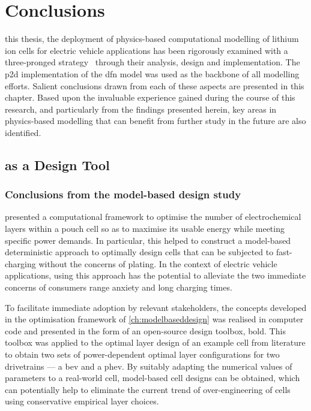 
\clearpage
\chapter{Conclusions}\label{ch:conclusions}
\startcontents[chapters]

\bigskip

 this  thesis, the  deployment of  physics-based computational
modelling  of lithium  ion  cells  for electric  vehicle  applications has  been
rigorously examined  with a three-pronged strategy  \viz~through their analysis,
design and implementation.  The \gls{p2d} implementation of  the \gls{dfn} model
was  used  as  the  backbone  of  all  modelling  efforts.  Salient  conclusions
drawn  from each  of these  aspects are  presented in  this chapter.  Based upon
the  invaluable  experience gained  during  the  course  of this  research,  and
particularly  from the  findings presented  herein, key  areas in  physics-based
modelling that can benefit from further study in the future are also identified.


\section{ as a Design Tool}

\subsection{Conclusions from the model-based design study}\label{sec:modelbasedconclusion}

 presented  a computational framework to  optimise the
number  of electrochemical  layers within  a pouch  cell so  as to  maximise its
usable energy while  meeting specific power demands. In  particular, this helped
to construct a model-based deterministic approach to optimally design cells that
can  be subjected  to  fast-charging without  the concerns  of  plating. In  the
context of electric vehicle applications,  using this approach has the potential
to alleviate  the two immediate concerns  of consumers \viz{} range  anxiety and
long charging times.

To  facilitate  immediate  adoption   by  relevant  stakeholders,  the  concepts
developed  in  the  optimisation  framework  of  \cref{ch:modelbaseddesign}  was
realised in  computer code and  presented in the  form of an  open-source design
toolbox, \gls{bold}. This toolbox was applied  to the optimal layer design of an
example cell from literature to obtain two sets of power-dependent optimal layer
configurations for two drivetrains --- a \gls{bev} and a \gls{phev}. By suitably
adapting the  numerical values of  parameters to a real-world  cell, model-based
cell  designs can  be  obtained, which  can potentially  help  to eliminate  the
current trend  of over-engineering of  cells using conservative  empirical layer
choices.

